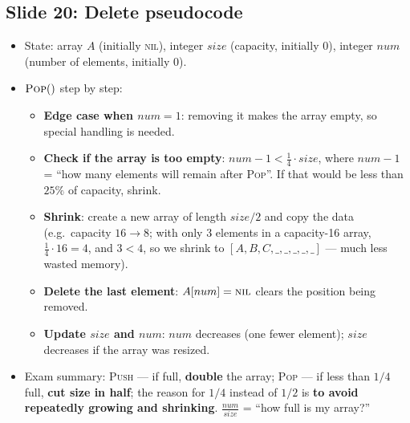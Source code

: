 \documentclass[11pt]{article}
\newcommand{\slide}[2]{\subsection*{Slide #1: #2}}
\begin{document}
\slide{20}{Delete pseudocode}
\begin{itemize}
  \item State: array $A$ (initially \textsc{nil}), integer $size$ (capacity, initially 0), integer $num$ (number of elements, initially 0).
  \item $\textsc{Pop}()$ step by step:
  \begin{itemize}
    \item \textbf{Edge case when $num = 1$}: removing it makes the array empty, so special handling is needed.
    \item \textbf{Check if the array is too empty}: $num - 1 < \tfrac14 \cdot size$, where $num - 1$ = ``how many elements will remain after \textsc{Pop}''. If that would be less than $25\%$ of capacity, shrink.
    \item \textbf{Shrink}: create a new array of length $size/2$ and copy the data (e.g.\ capacity $16 \to 8$; with only 3 elements in a capacity-16 array, $\tfrac14 \cdot 16 = 4$, and $3 < 4$, so we shrink to $[A,B,C,\_,\_,\_,\_,\_]$ --- much less wasted memory).
    \item \textbf{Delete the last element}: $A[num] = \textsc{nil}$ clears the position being removed.
    \item \textbf{Update $size$ and $num$}: $num$ decreases (one fewer element); $size$ decreases if the array was resized.
  \end{itemize}
  \item Exam summary: \textsc{Push} --- if full, \textbf{double} the array; \textsc{Pop} --- if less than $1/4$ full, \textbf{cut size in half}; the reason for $1/4$ instead of $1/2$ is \textbf{to avoid repeatedly growing and shrinking}. $\tfrac{num}{size}$ = ``how full is my array?''
\end{itemize}
\end{document}
